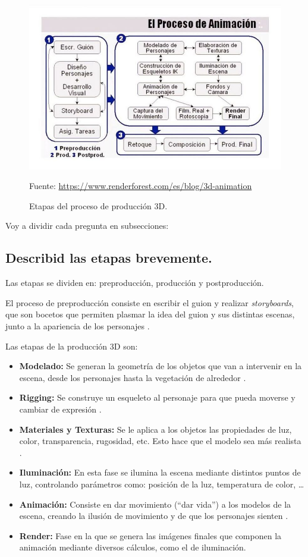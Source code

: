 \documentclass{article}
\begin{document}
\begin{figure}[H]
   \centering
   \includegraphics[width=\textwidth]{imagenes/prod.png}
   \caption{Etapas del proceso de producción 3D.}
   \vspace{10pt}
   \footnotesize{Fuente: \url{https://www.renderforest.com/es/blog/3d-animation}}
\end{figure}


Voy a dividir cada pregunta en subsecciones:

\subsection{Describid las etapas brevemente.}
Las etapas se dividen en: preproducción, producción y postproducción.

El proceso de preproducción consiste en escribir el guion y realizar \textit{storyboards}, que son bocetos que permiten plasmar la idea del guion y sus distintas escenas, junto a la apariencia de los personajes \cite{diapos}.

Las etapas de la producción 3D son:

\begin{itemize}
    \item \textbf{Modelado: }Se generan la geometría de los objetos que van a intervenir en la escena, desde los personajes hasta la vegetación de alrededor \cite{uclm}.
    \item \textbf{Rigging: }Se construye un esqueleto al personaje para que pueda moverse y cambiar de expresión \cite{animum}.
    \item \textbf{Materiales y Texturas: }Se le aplica a los objetos las propiedades de luz, color, transparencia, rugosidad, etc. Esto hace que el modelo sea más realista \cite{animum}.
    \item \textbf{Iluminación: }En esta fase se ilumina la escena mediante distintos puntos de luz, controlando parámetros como: posición de la luz, temperatura de color, \dots \cite{animum}
    \item \textbf{Animación: }Consiste en dar movimiento (``dar vida'') a los modelos de la escena, creando la ilusión de movimiento y de que los personajes sienten \cite{animum}.
    \item \textbf{Render: }Fase en la que se genera las imágenes finales que componen la animación mediante diversos cálculos, como el de iluminación.
\end{itemize}
\end{document}
